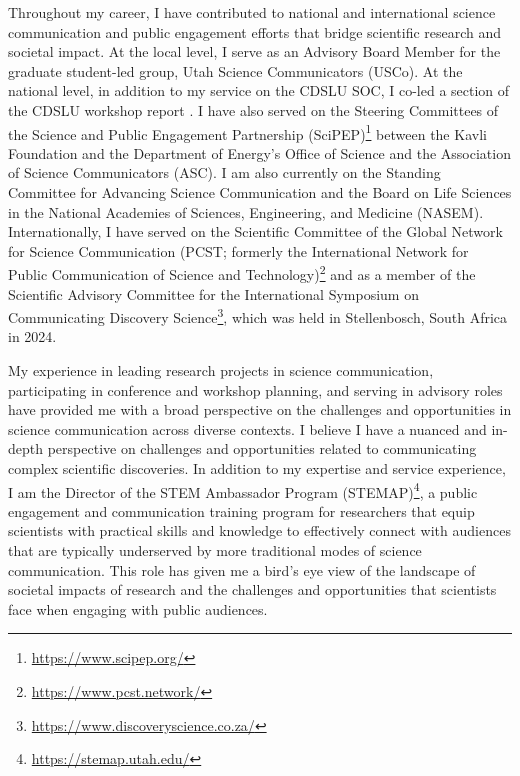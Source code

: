\documentclass[12pt]{article}
\begin{document}
\vspace{1em}

Throughout my career, I have contributed to national and international science communication and public engagement efforts that bridge scientific research and societal impact. At the local level, I serve as an Advisory Board Member for the graduate student-led group, Utah Science Communicators (USCo). At the national level, in addition to my service on the CDSLU SOC, I co-led a section of the CDSLU workshop report \parencite{bimmWorkshopReportCommunicatingforthcoming}. I have also served on the Steering Committees of the Science and Public Engagement Partnership (SciPEP)\footnote{\href{https://www.scipep.org/}{https://www.scipep.org/}} between the Kavli Foundation and the Department of Energy's Office of Science and the Association of Science Communicators (ASC). I am also currently on the Standing Committee for Advancing Science Communication and the Board on Life Sciences in the National Academies of Sciences, Engineering, and Medicine (NASEM). Internationally, I have served on the Scientific Committee of the Global Network for Science Communication (PCST; formerly the International Network for Public Communication of Science and Technology)\footnote{\href{https://www.pcst.network/}{https://www.pcst.network/}} and as a member of the Scientific Advisory Committee for the International Symposium on Communicating Discovery Science\footnote{\href{https://www.discoveryscience.co.za/}{https://www.discoveryscience.co.za/}}, which was held in Stellenbosch, South Africa in 2024.

\vspace{1em}

My experience in leading research projects in science communication, participating in conference and workshop planning, and serving in advisory roles have provided me with a broad perspective on the challenges and opportunities in science communication across diverse contexts. I believe I have a nuanced and in-depth perspective on challenges and opportunities related to communicating complex scientific discoveries. In addition to my expertise and service experience, I am the Director of the STEM Ambassador Program (STEMAP)\footnote{\href{https://stemap.utah.edu/}{https://stemap.utah.edu/}}, a public engagement and communication training program for researchers that equip scientists with practical skills and knowledge to effectively connect with audiences that are typically underserved by more traditional modes of science communication. This role has given me a bird's eye view of the landscape of societal impacts of research and the challenges and opportunities that scientists face when engaging with public audiences.
\end{document}
